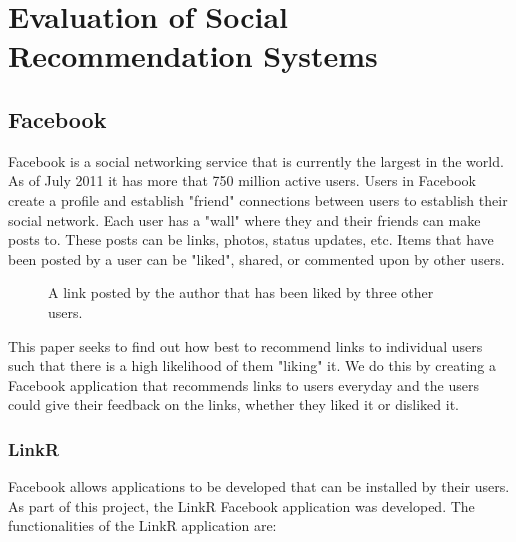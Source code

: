 
\chapter{Evaluation of Social Recommendation Systems}

\section{Facebook}

Facebook is a social networking service that is currently the largest in the world. As of July 2011 it has more that 750 million active users. Users in Facebook create a profile and establish "friend" connections between users to establish their social network. Each user has a "wall" where they and their friends can make posts to. These posts can be links, photos, status updates, etc. Items that have been posted by a user can be "liked", shared, or commented upon by other users. 

\begin{figure}[h]
\centering
{}
\caption{A link posted by the author that has been liked by three other users.}
\end{figure}

This paper seeks to find out how best to recommend links to individual users such that there is a high likelihood of them "liking" it. We do this by creating a Facebook application that recommends links to users everyday and the users could give their feedback on the links, whether they liked it or disliked it. 

\subsection{LinkR}
Facebook allows applications to be developed that can be installed by their users. As part of this project, the LinkR Facebook application was developed. The functionalities of the LinkR application are:

